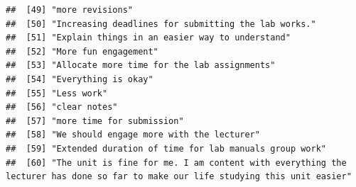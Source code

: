 \documentclass[
]{article}
\begin{document}
\begin{verbatim}
##  [49] "more revisions"                                                                                                                                                                                                        
##  [50] "Increasing deadlines for submitting the lab works."                                                                                                                                                                    
##  [51] "Explain things in an easier way to understand"                                                                                                                                                                         
##  [52] "More fun engagement"                                                                                                                                                                                                   
##  [53] "Allocate more time for the lab assignments"                                                                                                                                                                            
##  [54] "Everything is okay"                                                                                                                                                                                                    
##  [55] "Less work"                                                                                                                                                                                                             
##  [56] "clear notes"                                                                                                                                                                                                           
##  [57] "more time for submission"                                                                                                                                                                                              
##  [58] "We should engage more with the lecturer"                                                                                                                                                                               
##  [59] "Extended duration of time for lab manuals group work"                                                                                                                                                                  
##  [60] "The unit is fine for me. I am content with everything the lecturer has done so far to make our life studying this unit easier"                                                                                         

\end{verbatim}
\end{document}
